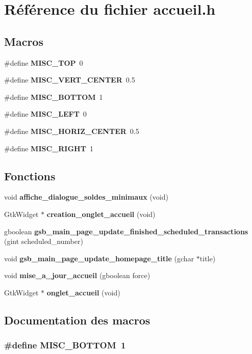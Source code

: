 \section{Référence du fichier accueil.h}
\label{accueil_8h}
\subsection*{Macros}
\begin{DoxyCompactItemize}
\item 
\#define {\bf MISC\_\-TOP}~0
\item 
\#define {\bf MISC\_\-VERT\_\-CENTER}~0.5
\item 
\#define {\bf MISC\_\-BOTTOM}~1
\item 
\#define {\bf MISC\_\-LEFT}~0
\item 
\#define {\bf MISC\_\-HORIZ\_\-CENTER}~0.5
\item 
\#define {\bf MISC\_\-RIGHT}~1
\end{DoxyCompactItemize}
\subsection*{Fonctions}
\begin{DoxyCompactItemize}
\item 
void {\bf affiche\_\-dialogue\_\-soldes\_\-minimaux} (void)
\item 
GtkWidget $\ast$ {\bf creation\_\-onglet\_\-accueil} (void)
\item 
gboolean {\bf gsb\_\-main\_\-page\_\-update\_\-finished\_\-scheduled\_\-transactions} (gint scheduled\_\-number)
\item 
void {\bf gsb\_\-main\_\-page\_\-update\_\-homepage\_\-title} (gchar $\ast$title)
\item 
void {\bf mise\_\-a\_\-jour\_\-accueil} (gboolean force)
\item 
GtkWidget $\ast$ {\bf onglet\_\-accueil} (void)
\end{DoxyCompactItemize}


\subsection{Documentation des macros}
\subsubsection[{MISC\_\-BOTTOM}]{\setlength{\rightskip}{0pt plus 5cm}\#define MISC\_\-BOTTOM~1}\label{accueil_8h_afd3dcdd30bc30451023c8f06d3936fa9}


